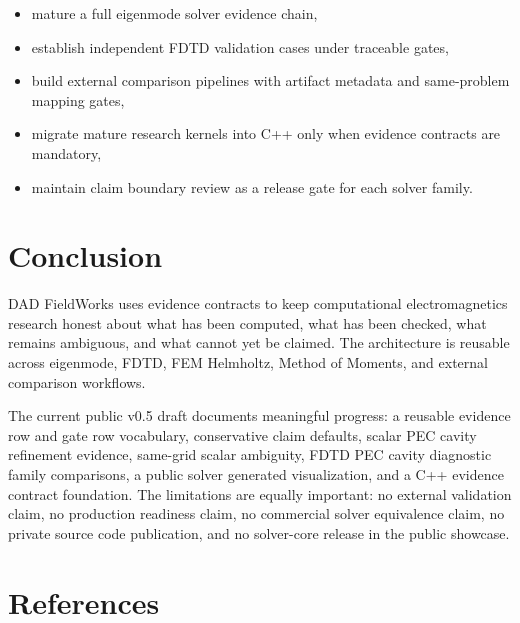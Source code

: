 \documentclass[11pt,a4paper]{article}
\begin{document}
\begin{itemize}
  \item mature a full eigenmode solver evidence chain,
  \item establish independent FDTD validation cases under traceable gates,
  \item build external comparison pipelines with artifact metadata and same-problem mapping gates,
  \item migrate mature research kernels into C++ only when evidence contracts are mandatory,
  \item maintain claim boundary review as a release gate for each solver family.
\end{itemize}

\section{Conclusion}
\label{sec:conclusion}

DAD FieldWorks uses evidence contracts to keep computational electromagnetics research honest about what has been computed, what has been checked, what remains ambiguous, and what cannot yet be claimed. The architecture is reusable across eigenmode, FDTD, FEM Helmholtz, Method of Moments, and external comparison workflows.

The current public v0.5 draft documents meaningful progress: a reusable evidence row and gate row vocabulary, conservative claim defaults, scalar PEC cavity refinement evidence, same-grid scalar ambiguity, FDTD PEC cavity diagnostic family comparisons, a public solver generated visualization, and a C++ evidence contract foundation. The limitations are equally important: no external validation claim, no production readiness claim, no commercial solver equivalence claim, no private source code publication, and no solver-core release in the public showcase.

\section{References}
\label{sec:references}
\end{document}
